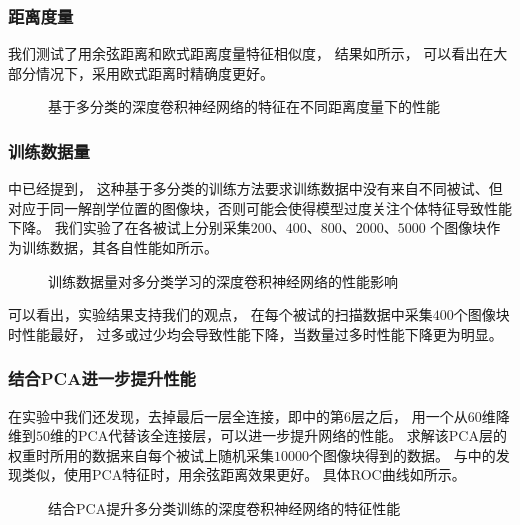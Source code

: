 \subsubsection{距离度量}
我们测试了用余弦距离和欧式距离度量特征相似度，
结果如所示，
可以看出在大部分情况下，采用欧式距离时精确度更好。

\begin{figure}[h!]
    \caption{基于多分类的深度卷积神经网络的特征在不同距离度量下的性能}
    \label{fig:expr:curve:clsfy:measure}
\end{figure}

\subsubsection{训练数据量}
中已经提到，
这种基于多分类的训练方法要求训练数据中没有来自不同被试、但
对应于同一解剖学位置的图像块，否则可能会使得模型过度关注个体特征导致性能下降。
我们实验了在各被试上分别采集$200$、$400$、$800$、$2000$、$5000$
个图像块作为训练数据，其各自性能如所示。
\begin{figure}[h!]
    \caption{训练数据量对多分类学习的深度卷积神经网络的性能影响}
    \label{fig:expr:curve:clsfy:datasize}
\end{figure}

可以看出，实验结果支持我们的观点，
在每个被试的扫描数据中采集$400$个图像块时性能最好，
过多或过少均会导致性能下降，当数量过多时性能下降更为明显。

\subsubsection{结合PCA进一步提升性能\label{sec:expr:clsfy:pca}}
在实验中我们还发现，去掉最后一层全连接，即中的第6层之后，
用一个从$60$维降维到$50$维的PCA代替该全连接层，可以进一步提升网络的性能。
求解该PCA层的权重时所用的数据来自每个被试上随机采集$10000$个图像块得到的数据。
与中的发现类似，使用PCA特征时，用余弦距离效果更好。
具体ROC曲线如所示。

\begin{figure}[h!]
    \centering
    \caption{结合PCA提升多分类训练的深度卷积神经网络的特征性能}
    \label{fig:expr:curve:clsfy:pca}
\end{figure}


